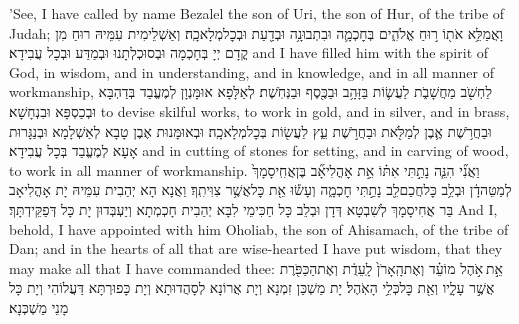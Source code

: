 {’See, I have called by name Bezalel the son of Uri, the son of Hur, of the tribe of Judah;}{}
{וָאֲמַלֵּ֥א אֹת֖וֹ ר֣וּחַ אֱלֹהִ֑ים בְּחׇכְמָ֛ה וּבִתְבוּנָ֥ה וּבְדַ֖עַת וּבְכׇל\maqqaf מְלָאכָֽה׃}
{וְאַשְׁלֵימִית עִמֵּיהּ רוּחַ מִן קֳדָם יְיָ בְּחָכְמָה וּבְסוּכְלְתָנוּ וּבְמַדַּע וּבְכָל עֲבִידָא׃}
{and I have filled him with the spirit of God, in wisdom, and in understanding, and in knowledge, and in all manner of workmanship,}{}
{לַחְשֹׁ֖ב מַחֲשָׁבֹ֑ת לַעֲשׂ֛וֹת בַּזָּהָ֥ב וּבַכֶּ֖סֶף וּבַנְּחֹֽשֶׁת׃}
{לְאַלָּפָא אוּמָּנְוָן לְמֶעֱבַד בְּדַהְבָּא וּבְכַסְפָּא וּבִנְחָשָׁא׃}
{to devise skilful works, to work in gold, and in silver, and in brass,}{}
{וּבַחֲרֹ֥שֶׁת אֶ֛בֶן לְמַלֹּ֖את וּבַחֲרֹ֣שֶׁת עֵ֑ץ לַעֲשׂ֖וֹת בְּכׇל\maqqaf מְלָאכָֽה׃}
{וּבְאוּמָּנוּת אֶבֶן טָבָא לְאַשְׁלָמָא וּבְנַגָּרוּת אָעָא לְמֶעֱבַד בְּכָל עֲבִידָא׃}
{and in cutting of stones for setting, and in carving of wood, to work in all manner of workmanship.}{}
{וַאֲנִ֞י הִנֵּ֧ה נָתַ֣תִּי אִתּ֗וֹ אֵ֣ת אׇהֳלִיאָ֞ב בֶּן\maqqaf אֲחִֽיסָמָךְ֙ לְמַטֵּה\maqqaf דָ֔ן וּבְלֵ֥ב כׇּל\maqqaf חֲכַם\maqqaf לֵ֖ב נָתַ֣תִּי חׇכְמָ֑ה וְעָשׂ֕וּ אֵ֖ת כׇּל\maqqaf אֲשֶׁ֥ר צִוִּיתִֽךָ׃}
{וַאֲנָא הָא יְהַבִית עִמֵּיהּ יָת אָהֳלִיאָב בַּר אֲחִיסָמָךְ לְשִׁבְטָא דְּדָן וּבְלֵב כָּל חַכִּימֵי לִבָּא יְהַבִית חָכְמְתָא וְיַעְבְּדוּן יָת כָּל דְּפַקֵּידְתָּךְ׃}
{And I, behold, I have appointed with him Oholiab, the son of Ahisamach, of the tribe of Dan; and in the hearts of all that are wise-hearted I have put wisdom, that they may make all that I have commanded thee:}{}
{אֵ֣ת \legarmeh  אֹ֣הֶל מוֹעֵ֗ד וְאֶת\maqqaf הָֽאָרֹן֙ לָֽעֵדֻ֔ת וְאֶת\maqqaf הַכַּפֹּ֖רֶת אֲשֶׁ֣ר עָלָ֑יו וְאֵ֖ת כׇּל\maqqaf כְּלֵ֥י הָאֹֽהֶל׃}
{יָת מַשְׁכַּן זִמְנָא וְיָת אֲרוֹנָא לְסָהֲדוּתָא וְיָת כָּפוּרְתָּא דַּעֲלוֹהִי וְיָת כָּל מָנֵי מַשְׁכְּנָא׃}
